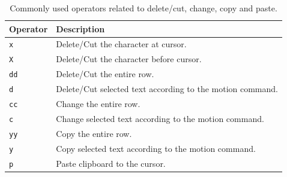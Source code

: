 \begin{table}
  \centering \caption{Commonly used operators related to delete/cut, change, copy and paste.}\label{ch3tab:deletecut}
  \begin{tabularx}{\textwidth}{lX}
    \hline
    Operator & Description \\ \hline
    \verb|x| & Delete/Cut the character at cursor. \\ \hdashline
    \verb|X| & Delete/Cut the character before cursor. \\ \hdashline
    \verb|dd| & Delete/Cut the entire row. \\ \hdashline
    \verb|d| & Delete/Cut selected text according to the motion command. \\ \hdashline
    \verb|cc| & Change the entire row. \\ \hdashline
    \verb|c| & Change selected text according to the motion command. \\ \hdashline
    \verb|yy| & Copy the entire row. \\ \hdashline
    \verb|y| & Copy selected text according to the motion command. \\ \hdashline
    \verb|p| & Paste clipboard to the cursor. \\
    \hline
  \end{tabularx}
\end{table}


